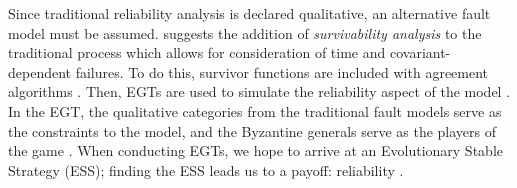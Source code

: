 \documentclass[twoside, conference]{IEEEtran}
\begin{document}
Since traditional reliability analysis is declared qualitative, an alternative fault model must be assumed. \cite{Ma2008} suggests the addition of \textit{survivability analysis} to the traditional process which allows for consideration of time and covariant-dependent failures. To do this, survivor functions are included with agreement algorithms \cite{Ma2008}. Then, EGTs are used to simulate the reliability aspect of the model \cite{Ma2008}. In the EGT, the qualitative categories from the traditional fault models serve as the constraints to the model, and the Byzantine generals serve as the players of the game \cite{Ma2008}. When conducting EGTs, we hope to arrive at an Evolutionary Stable Strategy (ESS); finding the ESS leads us to a payoff: reliability \cite{Ma2008}. 




\end{document}
